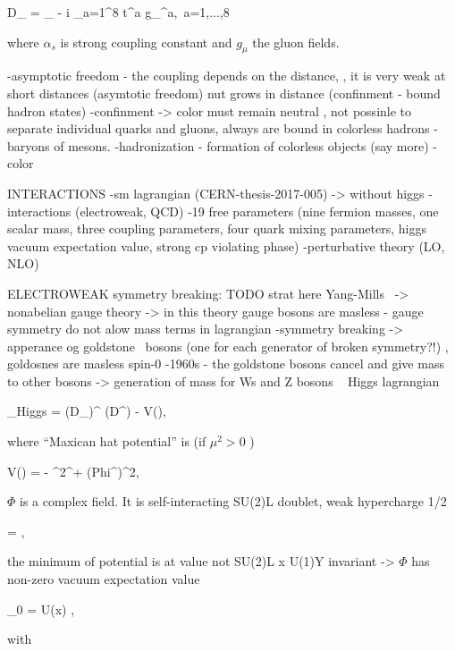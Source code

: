 {
   D_{\mu} = \partial_{\mu} - i \sum_{a=1}^{8} t^{a} g_{\mu}^{a},~a=1,...,8
}

where $\alpha_{s}$ is strong coupling constant and $g_{\mu}$ the gluon fields.


-asymptotic freedom - the coupling depends on the distance, , it is very weak at short distances (asymtotic freedom) nut grows in distance (confinment - bound hadron states)
-confinment -> color must remain neutral , not possinle to separate individual quarks and gluons, always are bound in colorless hadrons - baryons of mesons.
-hadronization - formation of colorless objects (say more) 
-color

INTERACTIONS
-sm lagrangian (CERN-thesis-2017-005) -> without higgs
-interactions (electroweak, QCD)
-19 free parameters (nine fermion masses, one scalar mass, three coupling parameters, four quark mixing parameters, higgs vacuum expectation value, strong cp violating phase)
-perturbative theory (LO, NLO)


ELECTROWEAK symmetry breaking: TODO strat here
Yang-Mills~\cite{Yang:1954ek} -> nonabelian gauge theory
-> in this theory gauge bosons are masless - gauge symmetry do not alow mass terms in lagrangian
-symmetry breaking -> apperance og goldstone~\cite{Goldstone:1961eq} bosons (one for each generator of broken symmetry?!) , goldosnes are masless spin-0
-1960s - the goldstone bosons cancel and give mass to other bosons -> generation of mass for Ws and Z bosons ~\cite{Englert:1964et, Higgs:1964ia, Guralnik:1964eu, Higgs:1966ev}
Higgs lagrangian

{
    _{Higgs} =  (D_{\mu}\Phi)^{\dagger} (D^{\mu}\Phi) - V(\Phi),
}

where ``Maxican hat potential'' is (if $\mu^2> 0$ )

{
    V(\Phi) =  -  \mu^{2}\Phi^{\dagger}\Phi +  \lambda(Phi^{\dagger}\Phi)^{2},
}

$\Phi$ is a complex field. It is self-interacting SU(2)L doublet, weak hypercharge 1/2


{
    \Phi =  ,
}

the minimum of potential is at value not SU(2)L x U(1)Y invariant -> $\Phi$ has non-zero vacuum expectation value


{
    \langle \Phi \rangle_{0} = U(x) ,
}

with

